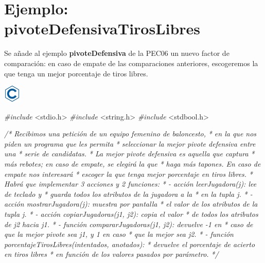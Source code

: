\documentclass[
]{book}
\newenvironment{Shaded}{\begin{snugshade}}{\end{snugshade}}
\newcommand{\CommentTok}[1]{\textcolor[rgb]{0.56,0.35,0.01}{\textit{#1}}}
\newcommand{\ImportTok}[1]{#1}
\newcommand{\PreprocessorTok}[1]{\textcolor[rgb]{0.56,0.35,0.01}{\textit{#1}}}
\begin{document}
\hypertarget{ejemplo-pivotedefensivatiroslibres}{%
\section{Ejemplo: pivoteDefensivaTirosLibres}\label{ejemplo-pivotedefensivatiroslibres}}

Se añade al ejemplo \textbf{pivoteDefensiva} de la PEC06 un nuevo factor de comparación: en caso de empate de las comparaciones anteriores, escogeremos la que tenga un mejor porcentaje de tiros libres.

\includegraphics{./img/c.png}

\begin{Shaded}
\begin{Highlighting}[]
\PreprocessorTok{\#include }\ImportTok{\textless{}stdio.h\textgreater{}}
\PreprocessorTok{\#include }\ImportTok{\textless{}string.h\textgreater{}}
\PreprocessorTok{\#include }\ImportTok{\textless{}stdbool.h\textgreater{}}

\CommentTok{/* Recibimos una petición de un equipo femenino de baloncesto,}
\CommentTok{ * en la que nos piden un programa que les permita}
\CommentTok{ * seleccionar la mejor pivote defensiva entre una}
\CommentTok{ * serie de candidatas.}
\CommentTok{ * La mejor pivote defensiva es aquella que captura}
\CommentTok{ * más rebotes; en caso de empate, se elegirá la que}
\CommentTok{ * haga más tapones. En caso de empate nos interesará}
\CommentTok{ * escoger la que tenga mejor porcentaje en tiros libres.}
\CommentTok{ * Habrá que implementar 3 acciones y 2 funciones:}
\CommentTok{ * {-} acción leerJugadora(j): lee de teclado y}
\CommentTok{ *   guarda todos los atributos de la jugadora a la}
\CommentTok{ *   en la tupla j.}
\CommentTok{ * {-} acción mostrarJugadora(j): muestra por pantalla}
\CommentTok{ *   el valor de los atributos de la tupla j.}
\CommentTok{ * {-} acción copiarJugadoras(j1, j2): copia el valor}
\CommentTok{ *   de todos los atributos de j2 hacia j1.}
\CommentTok{ * {-} función compararJugadoras(j1, j2): devuelve {-}1 en}
\CommentTok{ *   caso de que la mejor pivote sea j1, y 1 en caso}
\CommentTok{ *   que la mejor sea j2.}
\CommentTok{ * {-} función porcentajeTirosLibres(intentados, anotados):}
\CommentTok{ *   devuelve el porcentaje de acierto en tiros libres }
\CommentTok{ *   en función de los valores pasados por parámetro.}
\CommentTok{ */}
 

\end{Highlighting}
\end{Shaded}
\end{document}
